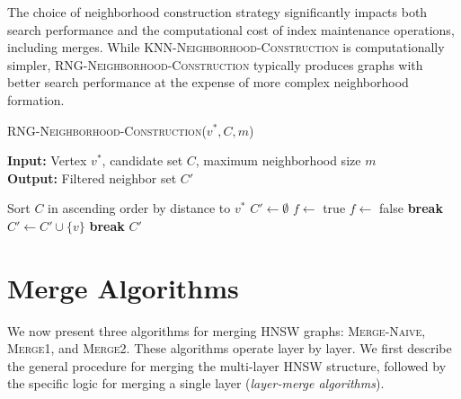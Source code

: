 \documentclass{article}
\begin{document}
The choice of neighborhood construction strategy significantly impacts both search performance and the computational cost of index maintenance operations, including merges. While \textsc{KNN-Neighborhood-Construction} is computationally simpler, \textsc{RNG-Neighborhood-Construction} typically produces graphs with better search performance at the expense of more complex neighborhood formation.

\begin{algorithm}
\caption{\textsc{RNG-Neighborhood-Construction}($v^*, C, m$)}\label{alg:rngstrategy}
\textbf{Input:} Vertex $v^*$, candidate set $C$, maximum neighborhood size $m$ \\
\textbf{Output:} Filtered neighbor set $C'$
\begin{algorithmic}[1]
\State Sort $C$ in ascending order by distance to $v^*$
\State $C' \gets \emptyset$
    \State $f \gets$ true
            \State $f \gets$ false
            \State \textbf{break}
        \EndIf
    \EndFor
        \State $C' \gets C' \cup \{v\}$
    \EndIf
        \State \textbf{break}
    \EndIf
\EndFor
\State \Return $C'$
\end{algorithmic}
\end{algorithm}

\section{Merge Algorithms}

We now present three algorithms for merging HNSW graphs: \textsc{Merge-Naive}, \textsc{Merge1}, and \textsc{Merge2}. These algorithms operate layer by layer. We first describe the general procedure for merging the multi-layer HNSW structure, followed by the specific logic for merging a single layer (\textit{layer-merge algorithms}).
\end{document}
